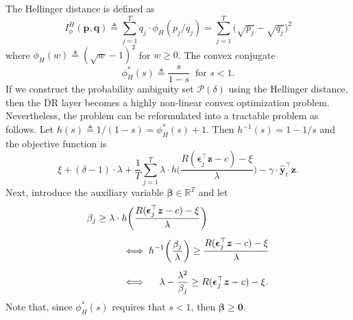 \documentclass[10pt, twocolumn]{article}
\theoremstyle{plain}
\theoremstyle{definition}
\begin{document}
\begin{appendices}
The Hellinger distance is defined as 
\[
	I_\phi^H(\bm{p},\bm{q}) \triangleq \sum_{j=1}^T q_j\cdot \phi_H(p_j/q_j) =
	 \sum_{j=1}^T \big( \sqrt{p_j} - \sqrt{q_j} \big)^2
\]
where \(\phi_H(w) \triangleq (\sqrt{w} - 1)^2\) for \(w\geq 0\). The convex 
conjugate 
\[
	\phi_H^*(s) \triangleq \frac{s}{1-s}\ \text{ for } s < 1.
\]
If we construct the probability ambiguity set \(\mathcal{P}(\delta)\) 
using the Hellinger distance, then the DR layer becomes a highly non-linear 
convex optimization problem.
Nevertheless, the problem can be reformulated into a tractable problem as 
follows. Let \(h(s) \triangleq 1/(1-s) = \phi_H^*(s) + 1\). Then
\(h^{-1}(s) = 1-1/s\) and the objective function is
\[
	\xi + (\delta-1)\cdot \lambda + \frac{1}{T} 
	\sum_{j=1}^T \lambda\cdot h\bigg(\frac{R(\bm{\epsilon}_j^\top \bm{z} - c) - 
	\xi}{\lambda}\bigg) - \gamma \cdot \hat{\bm{y}}_{t}^\top \bm{z}.
\]
Next, introduce the auxiliary variable \(\bm{\beta}\in\mathbb{R}^T\) and let
\begin{align}
	&\beta_j \geq \lambda\cdot h\bigg(\frac{R(\bm{\epsilon}_j^\top \bm{z} - c) - 
	\xi}{\lambda}\bigg)\nonumber\\[1ex]
	&\hspace*{35pt} \iff h^{-1}\bigg(\frac{\beta_j}{\lambda}\bigg) \geq 
	\frac{R(\bm{\epsilon}_j^\top \bm{z} - c) - \xi}{\lambda}\nonumber\\[1ex]
	&\hspace*{35pt} \iff\hspace*{11pt} \lambda - \frac{\lambda^2}{\beta_j}\geq 
	R(\bm{\epsilon}_j^\top \bm{z} - c) - \xi.\nonumber
\end{align}
Note that, since \(\phi_H^*(s)\) requires that \(s<1\), then \(\bm{\beta} \geq \bm{0}\). 


\end{appendices}
\end{document}
